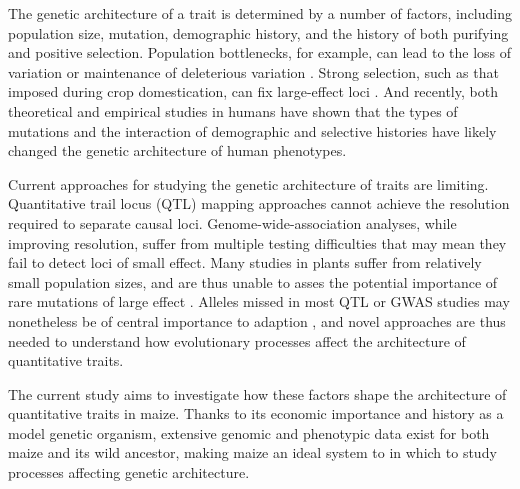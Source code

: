 The genetic architecture of a trait is determined by a number of factors, including population size, mutation, demographic history, and the history of both purifying and positive selection. Population bottlenecks, for example, can lead to the loss of variation or maintenance of deleterious variation \citep[e.g.][]{Renaut:2015hi, Gunther:2010}. Strong selection, such as that imposed during crop domestication, can fix large-effect loci \citep{Brown:2011}. And recently, both theoretical and empirical studies in humans have shown that the types of mutations \citep{Thornton:2013} and the interaction of demographic and selective histories \citep{Fu:2014jt, Gravel:2011iq, Henn:2015dp} have likely changed the genetic architecture of human phenotypes.

Current approaches for studying the genetic architecture of traits are limiting.  Quantitative trail locus (QTL) mapping approaches cannot achieve the resolution required to separate causal loci.  Genome-wide-association analyses, while improving resolution, suffer from multiple testing difficulties that may mean they fail to detect loci of small effect.  Many studies in plants suffer from relatively small population sizes, and are thus unable to asses the potential importance of rare mutations of large effect \citep[cf][]{Thornton:2013}.  
Alleles missed in most QTL or GWAS studies may nonetheless be of central importance to adaption \citep{Rockman:2011ej, Mackay:2009}, and novel approaches are thus needed to understand how evolutionary processes affect the architecture of quantitative traits.  

The current study aims to investigate how these factors shape the architecture of quantitative traits in maize.  
Thanks to its economic importance and history as a model genetic organism, extensive genomic \citep{Wright:2005,Hufford:2012dy} and phenotypic \citep{Wallace:2014,Weber:2009} data exist for both maize and its wild ancestor, making maize an ideal system to in which to study processes affecting genetic architecture.  


